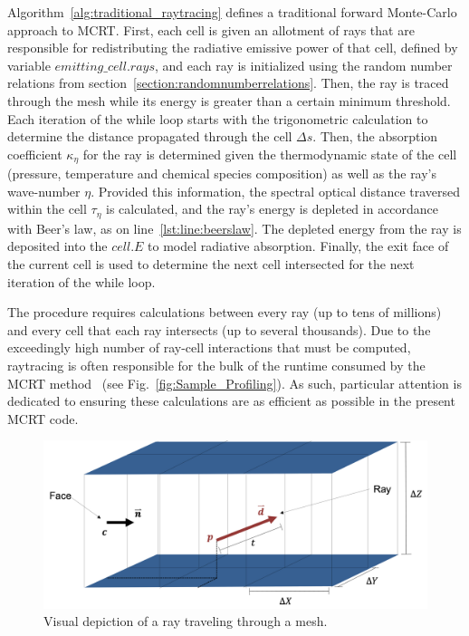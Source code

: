 Algorithm~\ref{alg:traditional_raytracing} defines a traditional forward Monte-Carlo approach to MCRT. First, each cell is given an allotment of rays that are responsible for redistributing the radiative emissive power of that cell, defined by variable $emitting\_cell.rays$, and each ray is initialized using the random number relations from section~\ref{section:randomnumberrelations}. Then, the ray is traced through the mesh while its energy is greater than a certain minimum threshold. Each iteration of the while loop starts with the trigonometric calculation to determine the distance propagated through the cell $\Delta{s}$. Then, the absorption coefficient $\kappa_\eta$ for the ray is determined given the thermodynamic state of the cell (pressure, temperature and chemical species composition) as well as the ray's wave-number $\eta$. Provided this information, the spectral optical distance traversed within the cell $\tau{}_\eta{}$ is calculated, and the ray's energy is depleted in accordance with Beer's law, as on line~\ref{lst:line:beerslaw}. The depleted energy from the ray is deposited into the $cell.E$ to model radiative absorption. Finally, the exit face of the current cell is used to determine the next cell intersected for the next iteration of the while loop.



The procedure requires calculations between every ray (up to tens of millions) and every cell that each ray intersects (up to several thousands). 
Due to the exceedingly high number of ray-cell interactions that must be computed, raytracing is often responsible for the bulk of the runtime consumed by the MCRT method~\cite{Humphrey2012RadiationSystem} (see Fig.~\ref{fig:Sample_Profiling}). As such, particular attention is dedicated to ensuring these calculations are as efficient as possible in the present MCRT code.
\begin{figure}
\centering
\includegraphics[width=0.8\linewidth]{figures/ch3/TracingThroughMesh.png}
\caption{Visual depiction of a ray traveling through a mesh. }
\label{fig:raytracing}
\end{figure}


